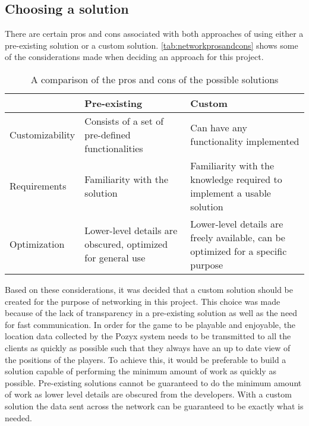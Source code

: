 \subsection{Choosing a solution}
There are certain pros and cons associated with both approaches of using either a pre-existing solution or a custom solution.
\autoref{tab:networkprosandcons} shows some of the considerations made when deciding an approach for this project.
\begin{table}[tbp]
    \begin{tabularx}{\textwidth}{|X|X|X|}
    \hline
                    & Pre-existing                                                & Custom                                                                            \\ \hline
    Customizability & Consists of a set of pre-defined functionalities            & Can have any functionality implemented                                            \\ \hline
    Requirements    & Familiarity with the solution                               & Familiarity with the knowledge required to implement a usable solution            \\ \hline
    Optimization    & Lower-level details are obscured, optimized for general use & Lower-level details are freely available, can be optimized for a specific purpose \\ \hline
    \end{tabularx}
    \caption{A comparison of the pros and cons of the possible solutions}
    \label{tab:networkprosandcons}
\end{table}
Based on these considerations, it was decided that a custom solution should be created for the purpose of networking in this project.
This choice was made because of the lack of transparency in a pre-existing solution as well as the need for fast communication.
In order for the game to be playable and enjoyable, the location data collected by the Pozyx system needs to be transmitted to all the clients as quickly as possible such that they always have an up to date view of the positions of the players.
To achieve this, it would be preferable to build a solution capable of performing the minimum amount of work as quickly as possible.
Pre-existing solutions cannot be guaranteed to do the minimum amount of work as lower level details are obscured from the developers.
With a custom solution the data sent across the network can be guaranteed to be exactly what is needed.

